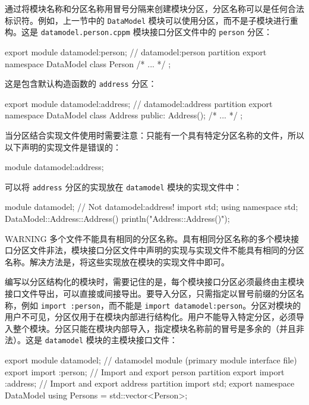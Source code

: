 通过将模块名称和分区名称用冒号分隔来创建模块分区，分区名称可以是任何合法标识符。例如，上一节中的 \verb|DataModel| 模块可以使用分区，而不是子模块进行重构。这是 \verb|datamodel.person.cppm| 模块接口分区文件中的 \verb|person| 分区：

\begin{cpp}
export module datamodel:person; // datamodel:person partition
export namespace DataModel { class Person { /* ... */ }; }
\end{cpp}

这是包含默认构造函数的 \verb|address| 分区：

\begin{cpp}
export module datamodel:address; // datamodel:address partition
export namespace DataModel
{
    class Address
    {
        public:
        Address();
        /* ... */
    };
}
\end{cpp}

当分区结合实现文件使用时需要注意：只能有一个具有特定分区名称的文件，所以以下声明的实现文件是错误的：

\begin{cpp}
module datamodel:address;
\end{cpp}

可以将 \verb|address| 分区的实现放在 \verb|datamodel| 模块的实现文件中：

\begin{cpp}
module datamodel; // Not datamodel:address!
import std;
using namespace std;
DataModel::Address::Address() { println("Address::Address()"); }
\end{cpp}

\begin{myWarning}{WARNING}
多个文件不能具有相同的分区名称。具有相同分区名称的多个模块接口分区文件非法，模块接口分区文件中声明的实现与实现文件不能具有相同的分区名称。解决方法是，将这些实现放在模块的实现文件中即可。
\end{myWarning}

编写以分区结构化的模块时，需要记住的是，每个模块接口分区必须最终由主模块接口文件导出，可以直接或间接导出。要导入分区，只需指定以冒号前缀的分区名称，例如 \verb|import :person|，而不能是 \verb|import datamodel:person|。分区对模块的用户不可见，分区仅用于在模块内部进行结构化。用户不能导入特定分区，必须导入整个模块。分区只能在模块内部导入，指定模块名称前的冒号是多余的（并且非法）。这是 \verb|datamodel| 模块的主模块接口文件：

\begin{cpp}
export module datamodel; // datamodel module (primary module interface file)
export import :person; // Import and export person partition
export import :address; // Import and export address partition
import std;
export namespace DataModel { using Persons = std::vector<Person>; }
\end{cpp}

